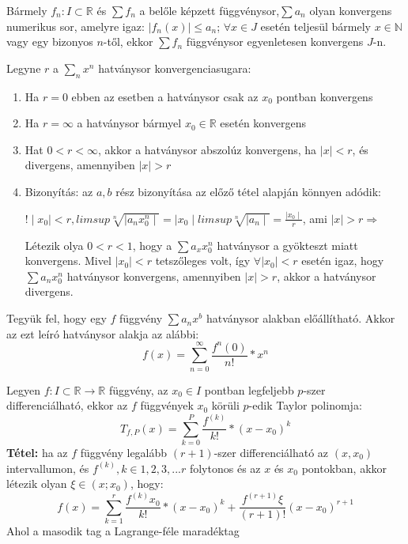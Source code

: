 \documentclass[11pt,a4paper]{article}
\begin{document}
\begin{tcolorbox}[colback=blue!5!white,colframe=blue!70!black,title= 4. Weierstrass-tétel]
    Bármely \(f_n : I \subset \mathbb{R} \) és \(\sum f_n\) a belőle képzett függvénysor,\(\sum a_n\) olyan konvergens numerikus sor, amelyre igaz: \(\mid f_n(x)\mid \leq
a_n\); \(\forall x \in J\) esetén teljesül bármely \(x \in \mathbb{N}\) vagy egy bizonyos \(n\)-től, ekkor
\(\sum f_n\) függvénysor egyenletesen konvergens \(J\)-n.
\end{tcolorbox}
\begin{tcolorbox}[colback=blue!5!white,colframe =blue!70!black,title= 5. Cauchy-Hadamard-tétel]
    Legyne \(r\) a \(\sum_n x^n\) hatványsor konvergenciasugara:
    \begin{enumerate}
        \item Ha \(r = 0\) ebben az esetben a hatványsor csak az \(x_0\) pontban konvergens
        \item Ha \(r = \infty \) a hatványsor bármyel \(x_0 \in \mathbb{R}\) esetén konvergens 
        \item Hat \(0< r < \infty\), akkor a hatványsor abszolúz konvergens, ha \(\mid x\mid < r\), és divergens, amennyiben \(\mid x\mid >r\)
        \item Bizonyítás: az \(a,b\) rész bizonyítása az előző tétel alapján könnyen adódik:
        \begin{center}
            \(! \mid x_0\mid < r, limsup \sqrt[n]{\mid a_n x_0^n\mid} = \mid x_0 \mid limsup\sqrt[n]{\mid a_n \mid} = \frac{\mid x_0 \mid}{r}\), ami \(\mid x \mid > r \Rightarrow \)
        \end{center}
        Létezik olya \(0 < r < 1\), hogy a \(\sum a_x x_0^n\) hatványsor a gyökteszt miatt konvergens. Mivel \(\mid x_0 \mid < r\) tetszőleges volt, így \(\forall \mid x_0 \mid < r\) esetén igaz, hogy \(\sum a_n x_0^n\) hatványsor konvergens, amennyiben \(\mid x \mid > r\), akkor a hatványsor divergens.
    \end{enumerate}
\end{tcolorbox}
\begin{tcolorbox}[colback=blue!5!white,colframe=blue!70!black,title= 6. Hatványsor]
Tegyük fel, hogy egy \(f\) függvény \(\sum a_n x^b\) hatványsor alakban előállítható. Akkor az ezt leíró hatványsor alakja az alábbi: 
$$f(x) = \sum_{n=0}^{\infty} \frac{f^n(0)}{n!} *x^n$$
\end{tcolorbox}
\begin{tcolorbox}[colback=blue!5!white,colframe=blue!70!black,title= 7. Taylor-polinom{,} Taylor-sor]
Legyen \(f: I \subset \mathbb{R} \to \mathbb{R}\) függvény, az \(x_0 \in I\) pontban legfeljebb \(p\)-szer differenciálható, ekkor  az \(f\) függvények \(x_0\) körüli \(p\)-edik Taylor polinomja:
$$T_{f,P}(x) = \sum_{k=0}^P \frac{f^(k)}{k!}* (x-x_0)^k$$
\textbf{Tétel:} ha az \(f\) függvény legalább \((r+1)\)-szer differenciálható az \((x, x_0)\) intervallumon, és \(f^(k), k \in 1, 2, 3, ... r\) folytonos és az \(x\) és \(x_0\) pontokban, akkor létezik olyan \(\xi \in (x; x_0)\), hogy:
$$f(x) = \sum_{k=1}^r \frac{f^{(k)}x_0}{k!}* (x-x_0)^k + \frac{f^{(r+1)}\xi}{(r+1)!}(x-x_0)^{r+1}$$
Ahol a masodik tag a Lagrange-féle maradéktag 
\end{tcolorbox}
\end{document}
